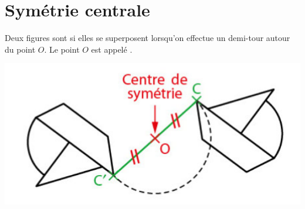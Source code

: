 \documentclass[xcolor={dvipsnames}]{beamer}
\begin{document}
\section{Symétrie centrale}


\begin{frame}
	\begin{mydef}
		
		Deux figures sont  si elles se superposent lorsqu'on effectue un demi-tour autour du point $O$. Le point $O$ est appelé .\pause
		
	\end{mydef}
	
	\begin{myex}
		\begin{center}
			\includegraphics[scale=.5]{fig2}
		\end{center}
	\end{myex}
\end{frame}
\end{document}
